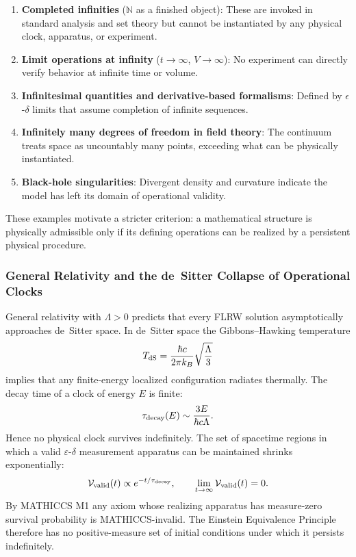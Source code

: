 \documentclass[11pt,a4paper]{article}
\begin{document}
\begin{enumerate}
  \item \textbf{Completed infinities} ($\mathbb{N}$ as a finished object): These are invoked in standard analysis and set theory but cannot be instantiated by any physical clock, apparatus, or experiment.
  \item \textbf{Limit operations at infinity} ($t \to \infty$, $V \to \infty$): No experiment can directly verify behavior at infinite time or volume.
  \item \textbf{Infinitesimal quantities and derivative-based formalisms}: Defined by $\epsilon$-$\delta$ limits that assume completion of infinite sequences.
  \item \textbf{Infinitely many degrees of freedom in field theory}: The continuum treats space as uncountably many points, exceeding what can be physically instantiated.
  \item \textbf{Black-hole singularities}: Divergent density and curvature indicate the model has left its domain of operational validity.
\end{enumerate}

These examples motivate a stricter criterion: a mathematical structure is physically admissible only if its defining operations can be realized by a persistent physical procedure.

\subsubsection{General Relativity and the de~Sitter Collapse of Operational Clocks}

General relativity with $\Lambda > 0$ predicts that every FLRW solution asymptotically approaches de~Sitter space. In de~Sitter space the Gibbons--Hawking temperature
\[
T_{\rm dS} = \frac{\hbar c}{2\pi k_B} \sqrt{\frac{\Lambda}{3}}
\]
implies that any finite-energy localized configuration radiates thermally. The decay time of a clock of energy $E$ is finite:
\[
\tau_{\rm decay}(E) \sim \frac{3E}{\hbar c \Lambda}.
\]
Hence no physical clock survives indefinitely. The set of spacetime regions in which a valid $\varepsilon$-$\delta$ measurement apparatus can be maintained shrinks exponentially:
\[
\mathcal{V}_{\rm valid}(t) \propto e^{-t/\tau_{\rm decay}}, \qquad \lim_{t\to\infty} \mathcal{V}_{\rm valid}(t) = 0.
\]
By MATHICCS M1 any axiom whose realizing apparatus has measure-zero survival probability is MATHICCS-invalid. The Einstein Equivalence Principle therefore has no positive-measure set of initial conditions under which it persists indefinitely.
\end{document}
